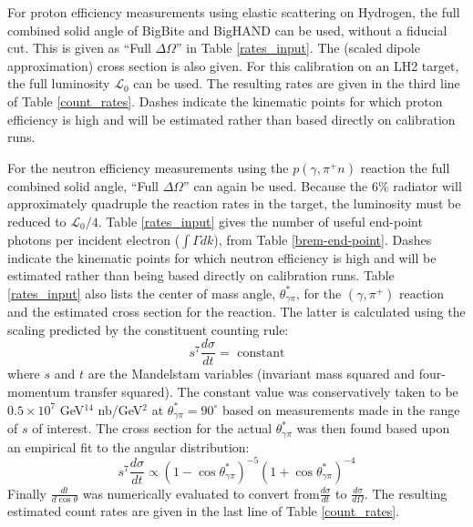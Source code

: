 \documentclass[12pt,letterpaper,oneside]{article}
\begin{document}
For proton efficiency measurements using elastic scattering on Hydrogen, 
the full combined solid angle of
BigBite and BigHAND can be used, without a fiducial cut.  This 
is given as ``Full
$\Delta\Omega$'' in Table \ref{rates_input}.  The (scaled dipole
approximation) cross section is also given.  For this calibration on
an LH2 target, the full luminosity $\mathcal{L}_0$ can be used.  The 
resulting rates are given in the third line of Table
\ref{count_rates}.
Dashes indicate the kinematic points for which proton efficiency is
high and will be estimated rather than based directly on calibration runs.

For the neutron efficiency measurements using the $p(\gamma,\pi^+n)$
reaction the full combined solid angle, ``Full $\Delta\Omega$''  can 
again be used.   Because
the 6\% radiator will approximately quadruple the reaction rates in
the target, the luminosity must be reduced to $\mathcal{L}_0/4$.
Table \ref{rates_input} gives the number of useful end-point photons
per incident electron ($\int \Gamma dk$), from Table
\ref{brem-end-point}. 
Dashes indicate the kinematic points for which neutron efficiency is
high and will
be estimated rather than being based directly on calibration runs.
Table \ref{rates_input} also
lists the center of mass angle, $\theta^*_{\gamma\pi}$,  for 
the $(\gamma,\pi^+)$ reaction and
the estimated cross section for the reaction.  The latter is
calculated using the scaling predicted by the constituent counting
rule:
$$s^7\frac{d\sigma}{dt}=\mbox{ constant}$$
where $s$ and $t$ are the Mandelstam variables (invariant mass squared
and four-momentum transfer squared).  The constant value was
conservatively taken to
be $0.5\times 10^7$ GeV$^{14}$ nb/GeV$^2$ at
$\theta^*_{\gamma\pi}=90^\circ $ based on 
measurements \cite{E94-104} made in the
range of $s$ of interest.  The cross section for  the
actual $\theta^*_{\gamma\pi}$ was then found based upon an
empirical fit \cite{Anderson} 
to the angular distribution:
$$s^7\frac{d\sigma}{dt}\propto(1-\cos\theta^*_{\gamma\pi})^{-5}
(1+\cos\theta^*_{\gamma\pi})^{-4}$$
Finally $\frac{dt}{d\cos\theta}$ was numerically evaluated to convert
from$ \frac{d\sigma}{dt}$ to $\frac{d\sigma}{d\Omega}$.
The resulting estimated count rates are given in the last line of Table
\ref{count_rates}.  %
\end{document}
